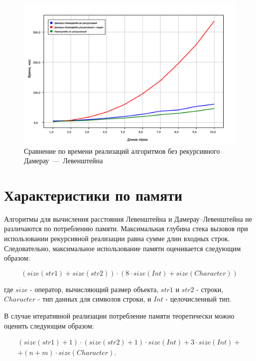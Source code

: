 \begin{figure}[h]
	\centering
	\includegraphics[height=0.4\textheight]{img/diag_01.pdf}
	\caption{Сравнение по времени реализаций алгоритмов без рекурсивного Дамерау~---~Левенштейна}
	\label{plt:time_02}
\end{figure}


\clearpage
\section{Характеристики по памяти}

Алгоритмы для вычисления расстояния Левенштейна и Дамерау--Левенштейна не различаются по потреблению памяти.
Максимальная глубина стека вызовов при использовании рекурсивной реализации равна сумме длин входных строк. 
Следовательно, максимальное использование памяти оценивается следующим образом:

\begin{equation}
(size(str1) + size(str2)) \cdot (8 \cdot size(Int) + size(Character))
\end{equation}

где $size$ - оператор, вычисляющий размер объекта, $str1$ и $str2$ - строки, $Character$ - тип данных для символов строки, и $Int$ - целочисленный тип.

В случае итеративной реализации потребление памяти теоретически можно оценить следующим образом:

\begin{equation}
	\begin{split}
(size(str1) + 1) \cdot (size(str2) + 1) \cdot size(Int) + 3\cdot size(Int) +\\
+ (n + m) \cdot size(Character).
	\end{split}
\end{equation}


